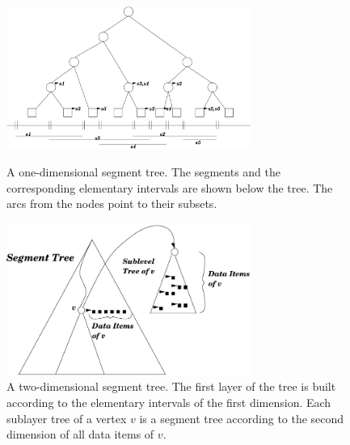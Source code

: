 \begin{ccTexOnly}
\begin{figure}[htbp]
\centering
\begin{minipage}{11cm}
    \begin{center}
    \includegraphics[width=8cm,clip]{SearchStructures/segment2}
    \end{center}
\caption{\label{User:fig:segment2.eps}A one-dimensional segment
  tree. The segments and the corresponding elementary intervals
  are shown below the tree. The arcs from the nodes point to
  their subsets.}
\vspace{2\baselineskip}
\end{minipage}
\hspace*{1em}
\begin{minipage}{11cm}
    \begin{center}
    \includegraphics[width=8cm,clip]{SearchStructures/d-segment}
    \end{center}
\caption{\label{User:fig:d-segment.eps}A two-dimensional segment
  tree. The first layer of the tree is built according to the
  elementary intervals of the first dimension. Each
  sublayer tree of a vertex $v$ is a segment tree according to
  the  second dimension of all data items of $v$.}

\end{minipage}
\end{figure}
\end{ccTexOnly}


